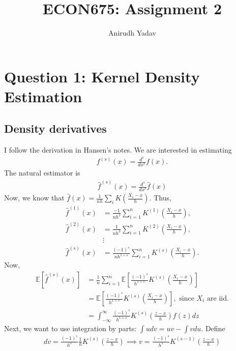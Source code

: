 \documentclass[12pt]{article}
\title{ECON675: Assignment 2}
\author{Anirudh Yadav}
\newcommand{\E}{\mathbb{E}}
\begin{document}
\maketitle

\setcounter{tocdepth}{2}
\tableofcontents

\newpage

\section{Question 1: Kernel Density Estimation}

\subsection{Density derivatives}
I follow the derivation in Hansen's notes. We are interested in estimating
\begin{align*}
f^{(s)}(x) = \frac{d^s}{dx^s}f(x).
\end{align*}
The natural estimator is
\begin{align*}
\hat f^{(s)}(x)= \frac{d^s}{dx^s}\hat f(x)
\end{align*}
Now, we know that $\hat f(x) = \frac{1}{nh}\sum_i K\left(\frac{X_i - x}{h}\right)$. Thus,
\begin{align*}
\hat f^{(1)}(x) &= \frac{-1}{nh^2}\sum_{i=1}^n K^{(1)}\left(\frac{X_i - x}{h}\right),\\
\hat f^{(2)}(x) &= \frac{1}{nh^3}\sum_{i=1}^n K^{(2)}\left(\frac{X_i - x}{h}\right),\\
&\vdots \\
\hat f^{(s)}(x) &= \frac{(-1)^s}{nh^{1+s}}\sum_{i=1}^n K^{(s)}\left(\frac{X_i - x}{h}\right).
\end{align*}
Now,
\begin{align*}
\E[\hat f^{(s)}(x)] &= \frac{1}{n} \sum_{i=1}^n \E\left[ \frac{(-1)^s}{h^{1+s}}K^{(s)}\left(\frac{X_i - x}{h}\right)\right]\\
&=\E\left[ \frac{(-1)^s}{h^{1+s}}K^{(s)}\left(\frac{X_i - x}{h}\right)\right], \text{ since $X_i$ are iid}.\\
&=\int_{-\infty}^{\infty} \frac{(-1)^s}{h^{1+s}}K^{(s)}\left(\frac{z - x}{h}\right)f(z)dz
\end{align*}
Next, we want to use integration by parts: $\int u dv = uv - \int vdu$. Define
\begin{align*}
dv = \frac{(-1)^s}{h^{s}}\frac{1}{h}K^{(s)}\left(\frac{z - x}{h}\right) \implies v = \frac{(-1)^s}{h^{s}}K^{(s-1)}\left(\frac{z - x}{h}\right)
\end{align*}
\end{document}
